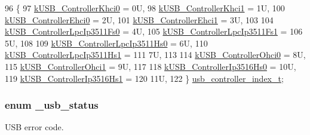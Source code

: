 \begin{DoxyCode}
96 \{
97     \hyperlink{group__usb__drv_ggabbaaa0009bbf8797e30a739960f3fd58a7ad5b317df9a862c39d8b1e7c91014f9}{kUSB\_ControllerKhci0} = 0U, 
98     \hyperlink{group__usb__drv_ggabbaaa0009bbf8797e30a739960f3fd58a6351ab500411d87ae2d1a75d2dfbec18}{kUSB\_ControllerKhci1} = 1U, 
100     \hyperlink{group__usb__drv_ggabbaaa0009bbf8797e30a739960f3fd58a7328be3149b15a646c781f1d0539ec78}{kUSB\_ControllerEhci0} = 2U, 
101     \hyperlink{group__usb__drv_ggabbaaa0009bbf8797e30a739960f3fd58a52f6d241c7c0a44f8e81c4f764b2b40d}{kUSB\_ControllerEhci1} = 3U, 
103 
104     \hyperlink{group__usb__drv_ggabbaaa0009bbf8797e30a739960f3fd58a7c0bf790cf25570c130884e8b21b991b}{kUSB\_ControllerLpcIp3511Fs0} = 4U, 
105     \hyperlink{group__usb__drv_ggabbaaa0009bbf8797e30a739960f3fd58a426c3914e817140f2f926d1f163a3655}{kUSB\_ControllerLpcIp3511Fs1} =
106         5U, 
108 
109     \hyperlink{group__usb__drv_ggabbaaa0009bbf8797e30a739960f3fd58ace87531e21705753ea4f1503d2da8882}{kUSB\_ControllerLpcIp3511Hs0} = 6U, 
110     \hyperlink{group__usb__drv_ggabbaaa0009bbf8797e30a739960f3fd58a3c37e570324545fcdb5992e10769b3a3}{kUSB\_ControllerLpcIp3511Hs1} =
111         7U, 
113 
114     \hyperlink{group__usb__drv_ggabbaaa0009bbf8797e30a739960f3fd58a711b1e29fb2c0dd68d20d59f31335972}{kUSB\_ControllerOhci0} = 8U, 
115     \hyperlink{group__usb__drv_ggabbaaa0009bbf8797e30a739960f3fd58a6416be8beb90241154641bb9a70855bb}{kUSB\_ControllerOhci1} = 9U, 
117 
118     \hyperlink{group__usb__drv_ggabbaaa0009bbf8797e30a739960f3fd58aff91853c79053e29ed39983b1ecbaab7}{kUSB\_ControllerIp3516Hs0} = 10U, 
119     \hyperlink{group__usb__drv_ggabbaaa0009bbf8797e30a739960f3fd58ae38749d26885d781cc8802c47e2ee37d}{kUSB\_ControllerIp3516Hs1} =
120         11U, 
122 \} \hyperlink{group__usb__drv_ga7050376bd615bfc9027ac2ab0fd853f3}{usb\_controller\_index\_t};
\end{DoxyCode}
\hypertarget{group__usb__drv_ga31d8e2352453c297062fe03df5193b22}{
\subsubsection[{\-\_\-usb\-\_\-status}]{\setlength{\rightskip}{0pt plus 5cm}enum {\bf \-\_\-usb\-\_\-status}}}\label{group__usb__drv_ga31d8e2352453c297062fe03df5193b22}


U\-S\-B error code. 


